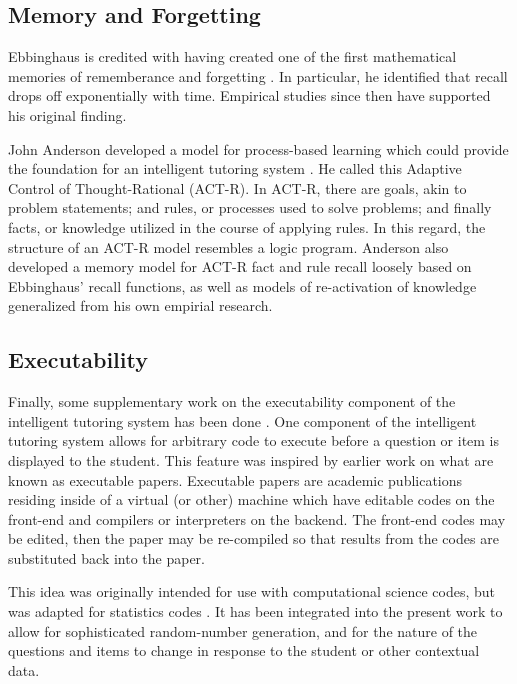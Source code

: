 \subsection{Memory and Forgetting}

Ebbinghaus is credited with having created one of the first mathematical
memories of rememberance and forgetting \cite{ebbinghaus}.  In particular, he
identified that recall drops off exponentially with time.  Empirical studies
since then have supported his original finding.

John Anderson developed a model for process-based learning which could provide
the foundation for an intelligent tutoring system \cite{anderson}.  He called
this Adaptive Control of Thought-Rational (ACT-R).  In ACT-R, there are goals,
akin to problem statements; and rules, or processes used to solve problems; and
finally facts, or knowledge utilized in the course of applying rules.  In this
regard, the structure of an ACT-R model resembles a logic program.  Anderson
also developed a memory model for ACT-R fact and rule recall loosely based on
Ebbinghaus' recall functions, as well as models of re-activation of knowledge
generalized from his own empirial research.  \cite{bacon2003assessing}


\subsection{Executability} 

Finally, some supplementary work on the executability component of the
intelligent tutoring system has been done \cite{castleberry2011}.  One
component of the intelligent tutoring system allows for arbitrary code to
execute before a question or item is displayed to the student.  This feature
was inspired by earlier work on what are known as executable papers.
Executable papers are academic publications residing inside of a virtual (or
other) machine which have editable codes on the front-end and compilers or
interpreters on the backend.  The front-end codes may be edited, then the
paper may be re-compiled so that results from the codes are substituted back
into the paper.  

This idea was originally intended for use with computational science codes, but
was adapted for statistics codes \cite{castleberry2013}.  It has been
integrated into the present work to allow for sophisticated random-number
generation, and for the nature of the questions and items to change in response
to the student or other contextual data.



